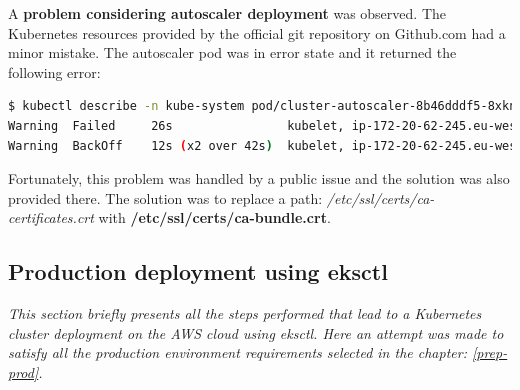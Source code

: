 A \textbf{problem considering autoscaler deployment} was observed. The Kubernetes resources provided by the official git repository on Github.com had a minor mistake. The autoscaler pod was in error state and it returned the following error:
\begin{lstlisting}[basicstyle=\tiny,caption={TODO},captionpos=b,language=Bash,xleftmargin=1cm]
$ kubectl describe -n kube-system pod/cluster-autoscaler-8b46dddf5-8xkns
Warning  Failed     26s                kubelet, ip-172-20-62-245.eu-west-1.compute.internal  Error: failed to start container "cluster-autoscaler": Error response from daemon: OCI runtime create failed: container_linux.go:346: starting container process caused "process_linux.go:449: container init caused \"rootfs_linux.go:58: mounting \\\"/etc/ssl/certs/ca-bundle.crt\\\" to rootfs \\\"/var/lib/docker/overlay2/0f99e6ea6c9a9f8dedf87b977b72ecff7b56e0e6e439fcd8f9275bda3dbcabe6/merged\\\" at \\\"/var/lib/docker/overlay2/0f99e6ea6c9a9f8dedf87b977b72ecff7b56e0e6e439fcd8f9275bda3dbcabe6/merged/etc/ssl/certs/ca-certificates.crt\\\" caused \\\"not a directory\\\"\"": unknown: Are you trying to mount a directory onto a file (or vice-versa)? Check if the specified host path exists and is the expected type
Warning  BackOff    12s (x2 over 42s)  kubelet, ip-172-20-62-245.eu-west-1.compute.internal  Back-off restarting failed container
\end{lstlisting}

Fortunately, this problem was handled by a public issue and the solution was also provided there\cite{as-github-issue}. The solution was to replace a path: \textit{/etc/ssl/certs/ca-certificates.crt} with \textbf{/etc/ssl/certs/ca-bundle.crt}.



\subsection{Production deployment using eksctl}
\textit{This section briefly presents all the steps performed that lead to a Kubernetes cluster deployment on the AWS cloud using eksctl. Here an attempt was made to satisfy all the production environment requirements selected in the chapter: \ref{prep-prod}.}
\\

